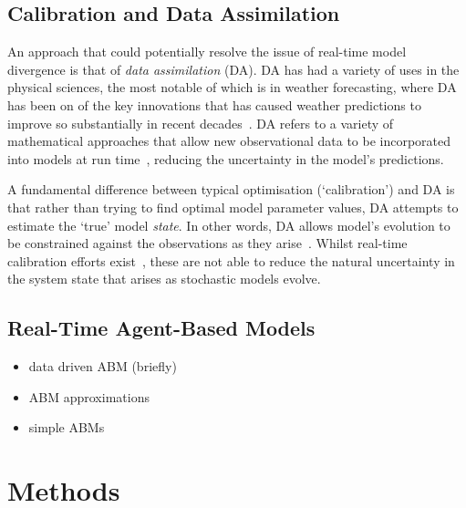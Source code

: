 \documentclass{article}
\begin{document}
\subsection{Calibration and Data Assimilation}

An approach that could potentially resolve the issue of real-time model divergence is that of \textit{data assimilation} (DA). DA has had a variety of uses in the physical sciences, the most notable of which is in weather forecasting, where DA has been on of the key innovations that has caused weather predictions to improve so substantially in recent decades~\citep{kalnay_atmospheric_2003}. DA refers to a variety of mathematical approaches that allow new observational data to be incorporated into models at run time~\citep{lewis_dynamic_2006}, reducing the uncertainty in the model's predictions. 

A fundamental difference between typical optimisation (`calibration') and DA is that rather than trying to find optimal model parameter values, DA attempts to estimate the `true' model \textit{state}. In other words, DA allows model’s evolution to be constrained against the observations as they arise~\citep{ward_dynamic_2016}. Whilst real-time calibration efforts exist~\citep[e.g.][]{oloo_predicting_2018}, these are not able to reduce the natural uncertainty in the system state that arises as stochastic models evolve.

\subsection{Real-Time Agent-Based Models}

    \begin{itemize}
    	\item data driven ABM (briefly)  \citep{oloo_predicting_2018} 
    	\item ABM approximations~\citep{ward_dynamic_2016, lueck_who_2019}
        \item simple ABMs~\citet{malleson_simulating_2020, clay_realtime_2020, tang_data_2022}
    \end{itemize}



\section{Methods}\label{sec:methods}
\end{document}
